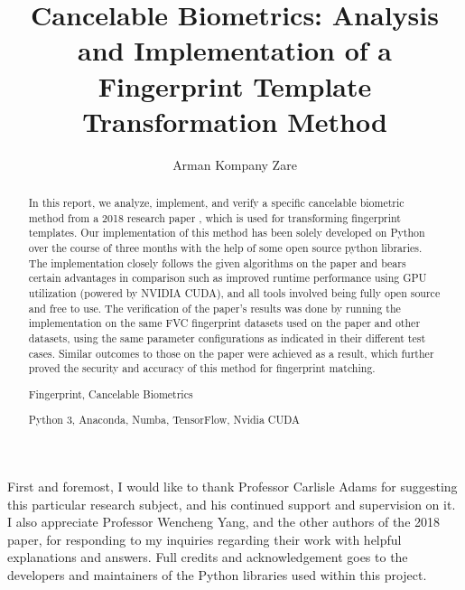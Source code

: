 \documentclass[fyp]{socreport}
\begin{document}
\title{Cancelable Biometrics: Analysis and Implementation of a Fingerprint Template Transformation Method}
\author{Arman Kompany Zare}
\maketitle
\begin{abstract}
In this report, we analyze, implement, and verify a specific cancelable biometric method from a 2018 research paper \cite{wencheng18cbio}, which is used for transforming fingerprint templates. Our implementation of this method has been solely developed on Python over the course of three months with the help of some open source python libraries. The implementation closely follows the given algorithms on the paper and bears certain advantages in comparison such as improved runtime performance using GPU utilization (powered by NVIDIA CUDA), and all tools involved being fully open source and free to use. The verification of the paper's results was done by running the implementation on the same FVC fingerprint datasets used on the paper and other datasets, using the same parameter configurations as indicated in their different test cases. Similar outcomes to those on the paper were achieved as a result, which further proved the security and accuracy of this method for fingerprint matching.

\begin{keywords}
	Fingerprint, Cancelable Biometrics
\end{keywords}
\begin{implement}
	Python 3, Anaconda, Numba, TensorFlow, Nvidia CUDA 
\end{implement}
\end{abstract}

\begin{acknowledgement}
   First and foremost, I would like to thank Professor Carlisle Adams for suggesting this particular research subject, and his continued support and supervision on it. I also appreciate Professor Wencheng Yang, and the other authors of the 2018 paper, for responding to my inquiries regarding their work with helpful explanations and answers. Full credits and acknowledgement goes to the developers and maintainers of the Python libraries used within this project.
\end{acknowledgement}


\tableofcontents 
\listoffigures
\listoftables
\end{document}

